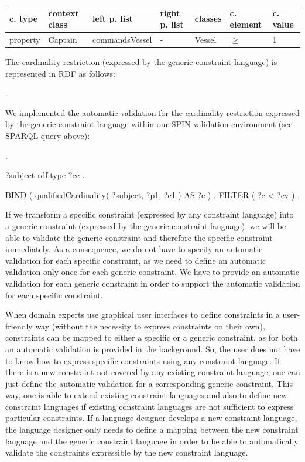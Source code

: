 \documentclass{llncs}
\newenvironment{gcotable}{
  \scriptsize
  \sffamily
  \vspace{0.3cm}
	\begin{center}
  \begin{tabular}{l|l|l|l|l|l|l}
  \hline
  \textbf{c. type} & \textbf{context class} & \textbf{left p. list} & \textbf{right p. list} & \textbf{classes} & \textbf{c. element} & \textbf{c. value} \\
  \hline

}{
  \hline
  \end{tabular}
	\end{center}
}
\begin{document}
\begin{gcotable}
property & Captain & commandsVessel & - & Vessel & $\geq$ & 1 \\
\end{gcotable}

The cardinality restriction (expressed by the generic constraint language) is represented in RDF as follows:

\begin{ex}
[   a PropertyConstraint ;
    contextClass StarFleetCaptain ;
    leftProperties ( commandsVessel ) ;
    classes ( Vessel ) ;
    constrainingElement ">=" ;
    constrainingValue "1" ] .
\end{ex}

We implemented the automatic validation for the cardinality restriction expressed by the generic constraint language within our SPIN validation environment (see SPARQL query above):

\begin{ex}
[   a PropertyConstraint ;
    contextClass ?cc ;
    leftProperties ( ?p1 ) ;
    classes ( ?c1 ) ;
    constrainingElement ">=" ;
    constrainingValue ?cv ] .
		
?subject rdf:type ?cc .

BIND ( qualifiedCardinality( ?subject, ?p1, ?c1 ) AS ?c ) .
FILTER ( ?c < ?cv ) .		  
\end{ex}

If we transform a specific constraint (expressed by any constraint language) into a generic constraint (expressed by the generic constraint language), we will be able to validate the generic constraint and therefore the specific constraint immediately. 
As a consequence, we do not have to specify an automatic validation for each specific constraint, as we need to define an automatic validation only once for each generic constraint. 
We have to provide an automatic validation for each generic constraint in order to support the automatic validation for each specific constraint.

When domain experts use graphical user interfaces to define constraints in a user-friendly way (without the necessity to express constraints on their own), 
constraints can be mapped to either a specific or a generic constraint, as for both an automatic validation is provided in the background.    
So, the user does not have to know how to express specific constraints using any constraint language.
If there is a new constraint not covered by any existing constraint language, one can just define the automatic validation for a corresponding generic constraint.
This way, one is able to extend existing constraint languages and also to define new constraint languages if existing constraint languages are not sufficient to express particular constraints.
If a language designer develops a new constraint language, 
the language designer only needs to define a mapping between the new constraint language and the generic constraint language
in order to be able to automatically validate the constraints expressible by the new constraint language.
\end{document}
